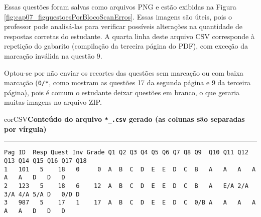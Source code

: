 Essas questões foram salvas como arquivos PNG e estão exibidas na Figura \ref{fig:cap07_figquestoesPorBlocoScanErros}. Essas imagens são úteis, pois o professor pode analisá-las para verificar possíveis alterações na quantidade de respostas corretas do estudante. A quarta linha deste arquivo CSV corresponde à repetição do gabarito (compilação da terceira página do PDF), com exceção da marcação inválida na questão 9. 

Optou-se por não enviar os recortes das questões sem marcação ou com baixa marcação (\verb|0/*|, como mostram as questões 17 da segunda página e 9 da terceira página), pois é comum o estudante deixar questões em branco, o que geraria muitas imagens no arquivo ZIP.

\begin{myboxCode}{corCSV}{\textbf{Conteúdo do arquivo \texttt{*\_.csv} gerado (as colunas são separadas por vírgula)}}\vspace{3mm}
\hrule
{\footnotesize
\begin{verbatim}
Pag ID  Resp Quest Inv Grade Q1 Q2 Q3 Q4 Q5 Q6 Q7 Q8 Q9  Q10 Q11 Q12 Q13 Q14 Q15 Q16 Q17 Q18
1   101   5    18   0     0  A  B  C  D  E  E  D  C  B   A   A   A   A   A   A   D   D   D
2   123   5    18   6    12  A  B  C  D  E  E  D  C  B   A   E/A 2/A 3/A 4/A 5/A D   0/D D
3   987   5    17   1    17  A  B  C  D  E  E  D  C  0/B A   A   A   A   A   A   D   D   D
\end{verbatim}
}
\end{myboxCode}


